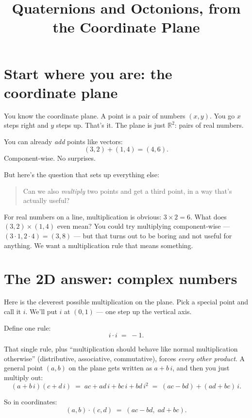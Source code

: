 \documentclass[11pt]{article}
\title{\textbf{Quaternions and Octonions, from the Coordinate Plane}}
\author{}
\date{}
\newcommand{\R}{\mathbb{R}}
\begin{document}
\maketitle

\vspace{-2em}

\section*{Start where you are: the coordinate plane}

You know the coordinate plane. A point is a pair of numbers
$(x, y)$. You go $x$ steps right and $y$ steps up. That's it.
The plane is just $\R^2$: pairs of real numbers.

You can already \emph{add} points like vectors:
\[
(3, 2) + (1, 4) = (4, 6) .
\]
Component-wise. No surprises.

But here's the question that sets up everything else:

\begin{quote}
  Can we also \emph{multiply} two points and get a third point, in a
  way that's actually useful?
\end{quote}

For real numbers on a line, multiplication is obvious: $3 \times 2 =
6$. What does $(3,2) \times (1,4)$ even mean? You could try
multiplying component-wise --- $(3 \cdot 1, 2 \cdot 4) = (3, 8)$ ---
but that turns out to be boring and not useful for anything. We want
a multiplication rule that means something.

\section*{The 2D answer: complex numbers}

Here is the cleverest possible multiplication on the plane. Pick a
special point and call it $i$. We'll put $i$ at $(0, 1)$ ---
one step up the vertical axis.

Define one rule:
\[
i \cdot i \;=\; -1 .
\]

That single rule, plus ``multiplication should behave like normal
multiplication otherwise'' (distributive, associative, commutative),
forces \emph{every other product}. A general point $(a, b)$ on the
plane gets written as $a + b\,i$, and then you just multiply out:
\[
(a + b\,i)(c + d\,i)
\;=\; ac + ad\,i + bc\,i + bd\,i^2
\;=\; (ac - bd) + (ad + bc)\,i .
\]

So in coordinates:
\[
(a, b) \cdot (c, d) \;=\; (ac - bd, \; ad + bc) .
\]
\end{document}
